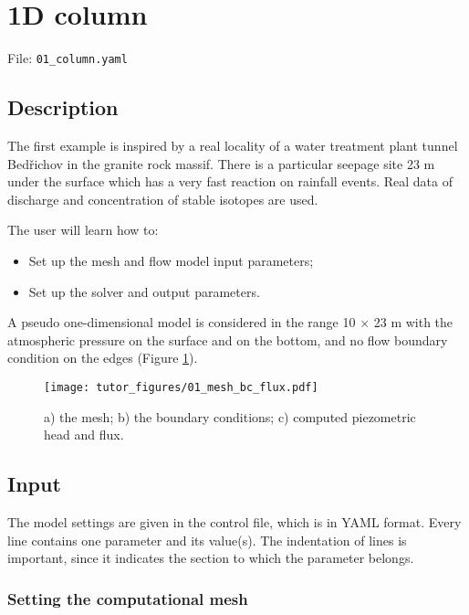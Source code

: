 \section{1D column}

File: \texttt{01\_column.yaml}

\subsection{Description}

The first example is inspired by a real locality of a water treatment
plant tunnel Bedřichov in the granite rock massif. There is a particular
seepage site 23 m under the surface which has a very fast reaction on
rainfall events. Real data of discharge and concentration of stable
isotopes are used.

The user will learn how to:

\begin{itemize}
\tightlist
\item
  Set up the mesh and flow model input parameters;
\item
  Set up the solver and output parameters.
\end{itemize}

A pseudo one-dimensional model is considered in the range 10 \(\times\)
23 m with the atmospheric pressure on the surface and on the bottom, and
no flow boundary condition on the edges (Figure \ref{fig:column_geom}).

\begin{figure}
\hypertarget{fig:column_geom}{%
\centering
\texttt{[image: tutor\_figures/01\_mesh\_bc\_flux.pdf]}
\caption{a) the mesh; b) the boundary conditions; c) computed
piezometric head and flux.}\label{fig:column_geom}
}
\end{figure}

\subsection{Input}

The model settings are given in the control file, which is in YAML
format. Every line contains one parameter and its value(s). The
indentation of lines is important, since it indicates the section to
which the parameter belongs.

\subsubsection{Setting the computational mesh}

